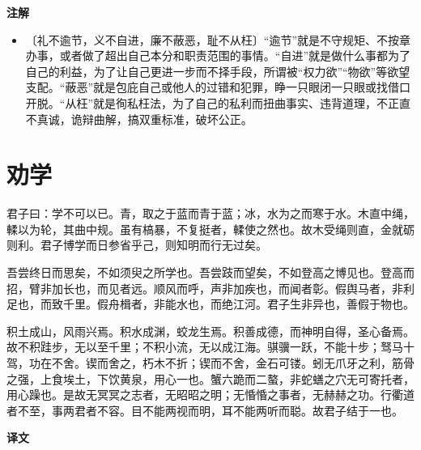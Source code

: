 \documentclass[12pt,UTF-8,openany,a4]{ctexbook}
\begin{document}
\newpage

\begin{Large}
    \noindent\textbf{注解}
\end{Large}


\vspace{-1em}

\begin{itemize}
    \setlength\itemsep{-0.2em}
    \item〔礼不逾节，义不自进，廉不蔽恶，耻不从枉〕{\yiwen “逾节”就是不守规矩、不按章办事，或者做了超出自己本分和职责范围的事情。“自进”就是做什么事都为了自己的利益，为了让自己更进一步而不择手段，所谓被“权力欲”“物欲”等欲望支配。“蔽恶”就是包庇自己或他人的过错和犯罪，睁一只眼闭一只眼或找借口开脱。“从枉”就是徇私枉法，为了自己的私利而扭曲事实、违背道理，不正直不真诚，诡辩曲解，搞双重标准，破坏公正。}
\end{itemize}


\chapter{劝学}

\begin{large}
    
    君子曰：学不可以已。青，取之于蓝而青于蓝；冰，水为之而寒于水。木直中绳，輮以为轮，其曲中规。虽有槁暴，不复挺者，輮使之然也。故木受绳则直，金就砺则利。君子博学而日参省乎己，则知明而行无过矣。
    
    吾尝终日而思矣，不如须臾之所学也。吾尝跂而望矣，不如登高之博见也。登高而招，臂非加长也，而见者远。顺风而呼，声非加疾也，而闻者彰。假舆马者，非利足也，而致千里。假舟楫者，非能水也，而绝江河。君子生非异也，善假于物也。
    
    积土成山，风雨兴焉。积水成渊，蛟龙生焉。积善成德，而神明自得，圣心备焉。故不积跬步，无以至千里；不积小流，无以成江海。骐骥一跃，不能十步；驽马十驾，功在不舍。锲而舍之，朽木不折；锲而不舍，金石可镂。蚓无爪牙之利，筋骨之强，上食埃土，下饮黄泉，用心一也。蟹六跪而二螯，非蛇蟮之穴无可寄托者，用心躁也。是故无冥冥之志者，无昭昭之明；无惛惛之事者，无赫赫之功。行衢道者不至，事两君者不容。目不能两视而明，耳不能两听而聪。故君子结于一也。

\end{large}


\newpage

\begin{Large}
    \noindent\textbf{译文}
\end{Large}


\vspace{1em}
\end{document}
